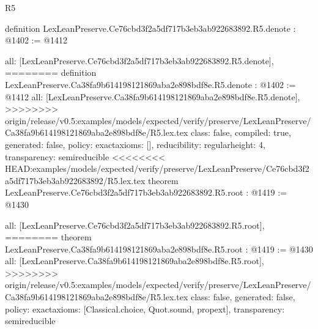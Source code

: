 \begin{lexlean}{R5}
\begin{coremodule}
{{{{{{{{{{{definition LexLeanPreserve.Ce76cbd3f2a5df717b3eb3ab922683892.R5.denote : @1402 := @1412 {
  all: [LexLeanPreserve.Ce76cbd3f2a5df717b3eb3ab922683892.R5.denote],
========
definition LexLeanPreserve.Ca38fa9b614198121869aba2e898bdf8e.R5.denote : @1402 := @1412 {
  all: [LexLeanPreserve.Ca38fa9b614198121869aba2e898bdf8e.R5.denote],
>>>>>>>> origin/release/v0.5:examples/models/expected/verify/preserve/LexLeanPreserve/Ca38fa9b614198121869aba2e898bdf8e/R5.lex.tex
  class: false,
  compiled: true,
  generated: false,
  policy: exact{axioms: []},
  reducibility: regular{height: 4},
  transparency: semireducible
}
<<<<<<<< HEAD:examples/models/expected/verify/preserve/LexLeanPreserve/Ce76cbd3f2a5df717b3eb3ab922683892/R5.lex.tex
theorem LexLeanPreserve.Ce76cbd3f2a5df717b3eb3ab922683892.R5.root : @1419 := @1430 {
  all: [LexLeanPreserve.Ce76cbd3f2a5df717b3eb3ab922683892.R5.root],
========
theorem LexLeanPreserve.Ca38fa9b614198121869aba2e898bdf8e.R5.root : @1419 := @1430 {
  all: [LexLeanPreserve.Ca38fa9b614198121869aba2e898bdf8e.R5.root],
>>>>>>>> origin/release/v0.5:examples/models/expected/verify/preserve/LexLeanPreserve/Ca38fa9b614198121869aba2e898bdf8e/R5.lex.tex
  class: false,
  generated: false,
  policy: exact{axioms: [Classical.choice, Quot.sound, propext]},
  transparency: semireducible
}

}}}}}}}}}}}}}
\end{coremodule}
\end{lexlean}
